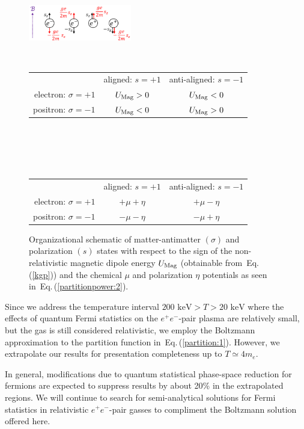 \documentclass[aps,prd,floatfix,reprint]{revtex4-2}
\newcommand*{\keV}{\text{ keV}}
\newcommand{\req}[1]{Eq.\,(\ref{#1})}
\newcommand\Tstrut{\rule{0pt}{2.6ex}} %
\newcommand\Bstrut{\rule[-0.9ex]{0pt}{0pt}} %
\newcommand{\TBstrut}{\Tstrut\Bstrut} %
\begin{document}
\begin{figure}[ht]
 \centering
 \includegraphics[width=0.4\textwidth]{plots/schematic.png}\Bstrut\\
 \begin{tabular}{ r|c|c| }
 \multicolumn{1}{r}{}
 & \multicolumn{1}{c}{aligned: $s=+1$}
 & \multicolumn{1}{c}{anti-aligned: $s=-1$} \\
 \cline{2-3}
 electron: $\sigma=+1$ & $U_{\rm Mag}>0$ & $U_{\rm Mag}<0$ \TBstrut\\
 \cline{2-3}
 positron: $\sigma=-1$ & $U_{\rm Mag}<0$ & $U_{\rm Mag}>0$ \TBstrut\\
 \cline{2-3}
 \end{tabular}\\\,\TBstrut\\
 \begin{tabular}{ r|c|c| }
 \multicolumn{1}{r}{}
 & \multicolumn{1}{c}{aligned: $s=+1$}
 & \multicolumn{1}{c}{anti-aligned: $s=-1$} \\
 \cline{2-3}
 electron: $\sigma=+1$ & $+\mu+\eta$ & $+\mu-\eta$ \TBstrut\\
 \cline{2-3}
 positron: $\sigma=-1$ & $-\mu-\eta$ & $-\mu+\eta$ \TBstrut\\
 \cline{2-3}
 \end{tabular}
 \caption{Organizational schematic of matter-antimatter $(\sigma)$ and polarization $(s)$ states with respect to the sign of the non-relativistic magnetic dipole energy $U_{\rm Mag}$ (obtainable from~\req{kgp}) and the chemical $\mu$ and polarization $\eta$ potentials as seen in~\req{partitionpower:2}.}
 \label{fig:schematic}
\end{figure}

Since we address the temperature interval $200\keV>T>20\keV$ where the effects of quantum Fermi statistics on the $e^{+}e^{-}$-pair plasma are relatively small, but the gas is still considered relativistic, we employ the Boltzmann approximation to the partition function in~\req{partition:1}. However, we extrapolate our results for presentation completeness up to $T\simeq 4m_{e}$.

In general, modifications due to quantum statistical phase-space reduction for fermions are expected to suppress results by about 20\% in the extrapolated regions. We will continue to search for semi-analytical solutions for Fermi statistics in relativistic $e^{+}e^{-}$-pair gasses to compliment the Boltzmann solution offered here. 
\end{document}
